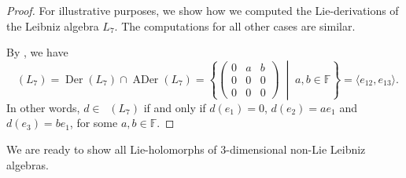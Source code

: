 \documentclass[11pt,a4paper]{amsart}
\theoremstyle{plain}
\theoremstyle{definition}
\theoremstyle{remark}
\numberwithin{equation}{section}
\newcommand{\0}{\emptyset}
\newcommand{\bF}{\mathbb{F}}
\DeclareMathOperator{\Der}{Der}
\DeclareMathOperator{\DerL}{Der_{Lie}}
\DeclareMathOperator{\ADer}{ADer}
\begin{document}
\begin{proof}
For illustrative purposes, we show how we computed the Lie-derivations of the Leibniz algebra $L_7$. The computations for all other cases are similar. 
	
By , we have
	\[
		\DerL(L_7)=\Der(L_7) \cap \ADer(L_7)=\left\{\begin{pmatrix}
		0 & a & b \\
		0 & 0 & 0 \\
		0 & 0 & 0 
		\end{pmatrix} \; \middle| \; a,b \in\bF\right\}=\langle e_{12},e_{13} \rangle.
	\]
	In other words, $d \in \DerL(L_7)$ if and only if $d(e_1)=0$, $d(e_2)=a e_1$ and $d(e_3)=b e_1$, for some $a,b \in \bF$.
\end{proof}

We are ready to show all Lie-holomorphs of $3$-dimensional non-Lie Leibniz algebras.
\end{document}
